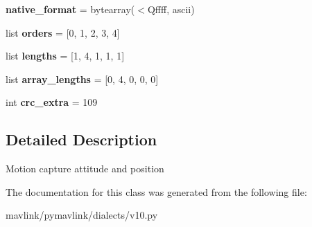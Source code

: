 \begin{DoxyCompactItemize}
{\bfseries native\+\_\+format} = bytearray(\textquotesingle{}$<$Qffff\textquotesingle{}, \textquotesingle{}ascii\textquotesingle{})
\item 
\mbox{\label{classpymavlink_1_1dialects_1_1v10_1_1MAVLink__att__pos__mocap__message_af110fad5107c9651f6924a7ca5c3ab96}} 
list {\bfseries orders} = \mbox{[}0, 1, 2, 3, 4\mbox{]}
\item 
\mbox{\label{classpymavlink_1_1dialects_1_1v10_1_1MAVLink__att__pos__mocap__message_a175dfdb76df327f3524087fa269d0d86}} 
list {\bfseries lengths} = \mbox{[}1, 4, 1, 1, 1\mbox{]}
\item 
\mbox{\label{classpymavlink_1_1dialects_1_1v10_1_1MAVLink__att__pos__mocap__message_a82b757f9a0d453f464652c974b498633}} 
list {\bfseries array\+\_\+lengths} = \mbox{[}0, 4, 0, 0, 0\mbox{]}
\item 
\mbox{\label{classpymavlink_1_1dialects_1_1v10_1_1MAVLink__att__pos__mocap__message_a53f354196802bd421e4804df35259af2}} 
int {\bfseries crc\+\_\+extra} = 109
\end{DoxyCompactItemize}


\subsection{Detailed Description}
\begin{DoxyVerb}Motion capture attitude and position
\end{DoxyVerb}
 

The documentation for this class was generated from the following file\+:\begin{DoxyCompactItemize}
\item 
mavlink/pymavlink/dialects/v10.\+py\end{DoxyCompactItemize}
